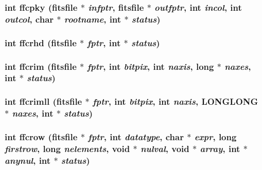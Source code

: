 \subsubsection{\setlength{\rightskip}{0pt plus 5cm}int ffcpky (\bf{fitsfile} $\ast$ {\em infptr}, \bf{fitsfile} $\ast$ {\em outfptr}, int {\em incol}, int {\em outcol}, char $\ast$ {\em rootname}, int $\ast$ {\em status})}\label{src_2fitsio_8h_0f50a2acda85502df96986d85ca07b9b}


\subsubsection{\setlength{\rightskip}{0pt plus 5cm}int ffcrhd (\bf{fitsfile} $\ast$ {\em fptr}, int $\ast$ {\em status})}\label{src_2fitsio_8h_edd8581511c1260a6da6ad625ce42d05}


\subsubsection{\setlength{\rightskip}{0pt plus 5cm}int ffcrim (\bf{fitsfile} $\ast$ {\em fptr}, int {\em bitpix}, int {\em naxis}, long $\ast$ {\em naxes}, int $\ast$ {\em status})}\label{src_2fitsio_8h_27679e1fb1c8a2f6a85e1d9f1d4295a7}


\subsubsection{\setlength{\rightskip}{0pt plus 5cm}int ffcrimll (\bf{fitsfile} $\ast$ {\em fptr}, int {\em bitpix}, int {\em naxis}, \bf{LONGLONG} $\ast$ {\em naxes}, int $\ast$ {\em status})}\label{src_2fitsio_8h_1f63a696ea6ed4ca47c04c67264d23e3}


\subsubsection{\setlength{\rightskip}{0pt plus 5cm}int ffcrow (\bf{fitsfile} $\ast$ {\em fptr}, int {\em datatype}, char $\ast$ {\em expr}, long {\em firstrow}, long {\em nelements}, void $\ast$ {\em nulval}, void $\ast$ {\em array}, int $\ast$ {\em anynul}, int $\ast$ {\em status})}\label{src_2fitsio_8h_7460392e7c0487148565dc632faae6f9}


